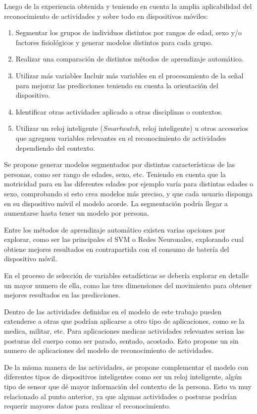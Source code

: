 Luego de la experiencia obtenida y teniendo en cuenta la amplia aplicabilidad
del reconocimiento de actividades y sobre todo en dispositivos móviles:
\begin{enumerate}
\item Segmentar los grupos de individuos distintos por rangos de edad, sexo
y/o factores fisiológicos y generar modelos distintos para cada grupo. 
\item Realizar una comparación de distintos métodos de aprendizaje automático. 
\item Utilizar más variables Incluir más variables en el procesamiento de
la señal para mejorar las predicciones teniendo en cuenta la orientación
del dispositivo. 
\item Identificar otras actividades aplicado a otras disciplinas o contextos. 
\item Utilizar un reloj inteligente (\emph{Smartwatch}, reloj inteligente)
u otros accesorios que agreguen variables relevantes en el reconocimiento
de actividades dependiendo del contexto. 
\end{enumerate}
Se propone generar modelos segmentados por distintas características
de las personas, como ser rango de edades, sexo, etc. Teniendo en
cuenta que la motricidad para en las diferentes edades por ejemplo
varía para distintas edades o sexo, comprobando si esto crea modelos
más preciso, y que cada usuario disponga en su dispositivo móvil el
modelo acorde. La segmentación podría llegar a aumentarse hasta tener
un modelo por persona.

Entre los métodos de aprendizaje automático existen varias opciones
por explorar, como ser las principales el SVM
o Redes Neuronales, explorando cual obtiene mejores resultados en
contrapartida con el consumo de batería del dispositivo móvil.

En el proceso de selección de variables estadísticas se debería explorar
en detalle un mayor numero de ella, como las tres dimensiones del
movimiento para obtener mejores resultados en las predicciones. 

Dentro de las actividades definidas en el modelo de este trabajo pueden
extenderse a otras que podrían aplicarse a otro tipo de aplicaciones,
como se la medica, militar, etc. Para aplicaciones medicas actividades
relevantes serian las posturas del cuerpo como ser parado, sentado,
acostado. Esto propone un sin numero de aplicaciones del modelo de
reconocimiento de actividades. 

De la misma manera de las actividades, se propone complementar el
modelo con diferentes tipos de dispositivos inteligentes como ser
un reloj inteligente, algún tipo de sensor que dé mayor información
del contexto de la persona. Esto va muy relacionado al punto anterior,
ya que algunas actividades o posturas podrían requerir mayores datos
para realizar el reconocimiento.
